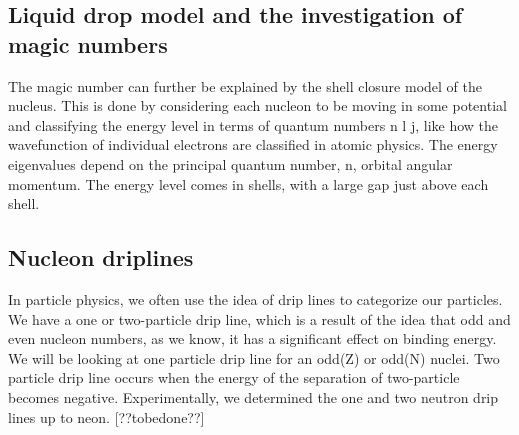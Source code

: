 \subsection{Liquid drop model and the investigation of magic numbers}
The magic number can further be explained by the shell closure model of the nucleus.
This is done by considering each nucleon to be moving in some potential and classifying the energy level in terms of quantum numbers n l j, like how the wavefunction of individual electrons are classified in atomic physics.
The energy eigenvalues depend on the principal quantum number, n, orbital angular momentum.
The energy level comes in shells, with a large gap just above each shell. \cite{smolanczuk_particle}

\subsection{Nucleon driplines}
In particle physics, we often use the idea of drip lines to categorize our particles.
We have a one or two-particle drip line, which is a result of the idea that odd and even nucleon numbers, as we know, it has a significant effect on binding energy.
We will be looking at one particle drip line for an odd(Z) or odd(N) nuclei.
Two particle drip line occurs when the energy of the separation of two-particle becomes negative.
Experimentally, we determined the one and two neutron drip lines up to neon. [??tobedone??]
